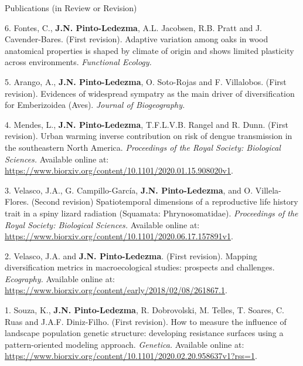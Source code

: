 \documentclass{resume} %
\begin{document}
\begin{rSection}{Publications (in Review or Revision)}

{6.} {Fontes, C.,} {\bf{J.N. Pinto-Ledezma}}, {A.L. Jacobsen, R.B. Pratt and J. Cavender-Bares. (First revision). Adaptive variation among oaks in wood anatomical properties is shaped by climate of origin and shows limited plasticity across environments.} {\em Functional Ecology.}

{5.} {Arango, A.,} {\bf{J.N. Pinto-Ledezma}}, { O. Soto-Rojas and F. Villalobos. (First revision). Evidences of widespread sympatry as the main driver of diversification for Emberizoidea (Aves).} {\em Journal of Biogeography.}

{4.} {Mendes, L.,} {\bf{J.N. Pinto-Ledezma}}, {T.F.L.V.B. Rangel and R. Dunn. (First revision). Urban warming inverse contribution on risk of dengue transmission in the southeastern North America.} {\em Proceedings of the Royal Society: Biological Sciences.} {Available online at:} \url {https://www.biorxiv.org/content/10.1101/2020.01.15.908020v1}.

{3.} {Velasco, J.A., G. Campillo-García,} {\bf{J.N. Pinto-Ledezma}}, {and O. Villela-Flores. (Second revision) Spatiotemporal dimensions of a reproductive life history trait in a spiny lizard radiation (Squamata: Phrynosomatidae).} {\em Proceedings of the Royal Society: Biological Sciences.} {Available online at:} \url {https://www.biorxiv.org/content/10.1101/2020.06.17.157891v1}.

{2.} {Velasco, J.A. and} {\bf{J.N. Pinto-Ledezma}}. {(First revision). Mapping diversification metrics in macroecological studies: prospects and challenges.} {\em Ecography.} {Available online at:} \url {https://www.biorxiv.org/content/early/2018/02/08/261867.1}.

{1.} {Souza, K.,} {\bf{J.N. Pinto-Ledezma}}, {R. Dobrovolski, M. Telles, T. Soares, C. Ruas and J.A.F. Diniz-Filho. (First revision). How to measure the influence of landscape population genetic structure: developing resistance surfaces using a pattern-oriented modeling approach.} {\em Genetica.} {Available online at:} \url {https://www.biorxiv.org/content/10.1101/2020.02.20.958637v1?rss=1}.

\end{rSection}

\end{document}
